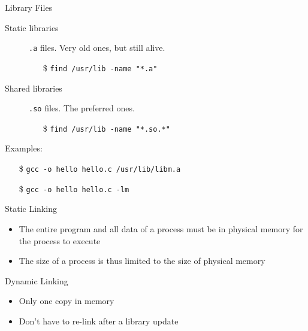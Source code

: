\begin{frame}{Library Files}
  \begin{description}
  \item[Static libraries] \alert{\texttt{.a}} files. Very old ones, but still alive.
    \begin{itemize}
    \item[\$] \texttt{find /usr/lib -name "*.a"}
    \end{itemize}
  \item[Shared libraries] \alert{\texttt{.so}} files. The preferred ones.
    \begin{itemize}
    \item[\$] \texttt{find /usr/lib -name "*.so.*"}
    \end{itemize}
  \end{description}
  Examples:
  \begin{itemize}
  \item[\$] \texttt{gcc -o hello hello.c /usr/lib/libm.a}
  \item[\$] \texttt{gcc -o hello hello.c -lm}
  \end{itemize}
\end{frame}

\begin{frame}
  \begin{block}{Static Linking}
    \begin{itemize}
    \item The entire program and all data of a process must be in physical memory for the
      process to execute
    \item The size of a process is thus limited to the size of physical memory
    \end{itemize}
  \end{block}
    \begin{center}
  \end{center}
\end{frame}

\begin{frame}
  \begin{block}{Dynamic Linking}
    \begin{itemize}
    \item Only one copy in memory
    \item Don't have to re-link after a library update
    \end{itemize}
  \end{block}
  \begin{center}
  \end{center}
\end{frame}

